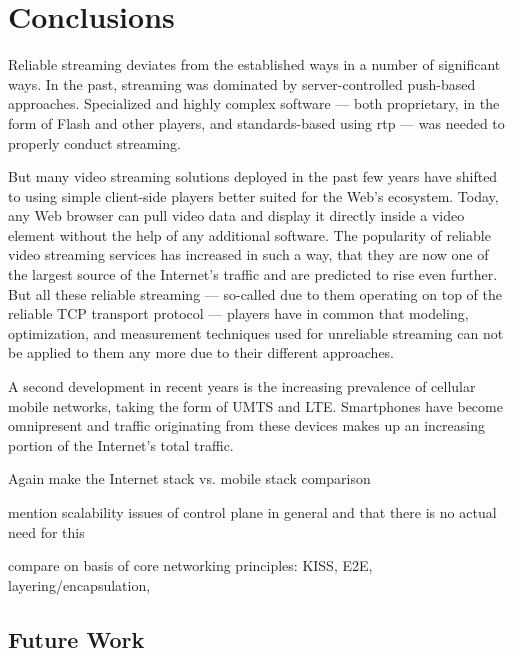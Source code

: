 \chapter{Conclusions}
\label{chap:conclusion}

Reliable streaming deviates from the established ways in a number of significant ways. In the past, streaming was dominated by server-controlled push-based approaches. Specialized and highly complex software --- both proprietary, in the form of Flash and other players, and standards-based using \gls{rtp} --- was needed to properly conduct streaming. 

But many video streaming solutions deployed in the past few years have shifted to using simple client-side players better suited for the Web's ecosystem. Today, any Web browser can pull video data and display it directly inside a video element without the help of any additional software. The popularity of reliable video streaming services has increased in such a way, that they are now one of the largest source of the Internet's traffic and are predicted to rise even further. But all these reliable streaming --- so-called due to them operating on top of the reliable \gls{TCP} transport protocol --- players have in common that modeling, optimization, and measurement techniques used for unreliable streaming can not be applied to them any more due to their different approaches.


A second development in recent years is the increasing prevalence of cellular mobile networks, taking the form of \gls{UMTS} and \gls{LTE}. Smartphones have become omnipresent and traffic originating from these devices makes up an increasing portion of the Internet's total traffic.



Again make the Internet stack vs. mobile stack comparison

mention scalability issues of control plane in general and that there is no actual need for this

compare on basis of core networking principles: KISS, E2E, layering/encapsulation, 





\section{Future Work}
